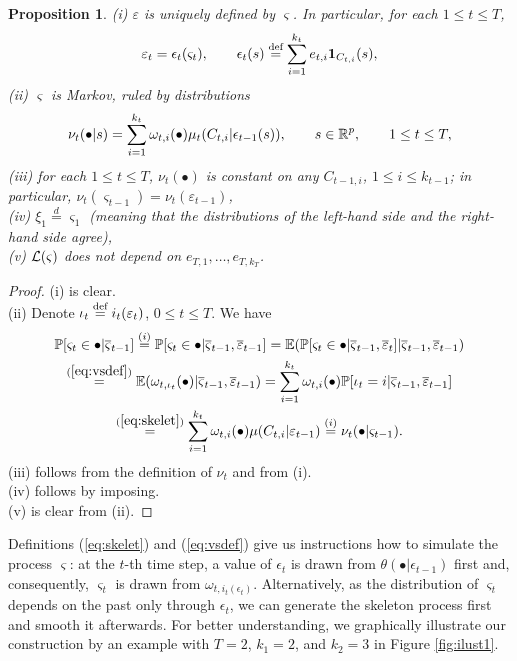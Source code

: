 \documentclass{article}              %
\newtheorem{proposition}{Proposition}
\begin{document}
\begin{proposition}
\label{prop:vs}(i) $\varepsilon$ is uniquely defined by $\varsigma$.
In particular, for each $1\leq t\leq T$, 
\[
\varepsilon_{t}=\epsilon_{t}(\varsigma_{t}),\qquad\epsilon_{t}(s)\stackrel{\text{\rm def}}{=}\sum_{i=1}^{k_{t}}e_{t,i}\mathbf{1}_{C_{t,i}}(s),
\]
(ii) $\varsigma$ is Markov, ruled by distributions 
\[
\nu_{t}(\bullet|s)=\sum_{i=1}^{k_{t}}\omega_{t,i}(\bullet)\mu_{t}(C_{t,i}|\epsilon_{t-1}(s)),\qquad s\in\mathbb{R}^p,\qquad  1\leq t\leq T,
\]
(iii) for each $1\leq t\leq T$, $\nu_{t}(\bullet)$ is constant on any $C_{t-1,i}$, $1\leq i\leq k_{t-1}$; in particular, $\nu_{t}(\varsigma_{t-1})=\nu_{t}(\varepsilon_{t-1})$,\\
(iv) $\xi_{1}\stackrel{d}{=}\varsigma_{1}$ (meaning that the distributions of the left-hand side and the right-hand side agree),\\
(v) $\mathcal{L}(\varsigma)$ does not depend on $e_{T,1},\dots,e_{T,k_T}$.
\end{proposition}

\begin{proof}
(i) is clear.\\
(ii) Denote 
$\iota_{t}\stackrel{\text{\rm def}}{=} i_{t}(\varepsilon_{t})$, $0\leq t\leq T.$
We have
\begin{multline*}
\mathbb{P}[\varsigma_{t}\in\bullet|\overline{\varsigma}_{t-1}]\stackrel{(i)}{=}\mathbb{P}[\varsigma_{t}\in\bullet|\overline{\varsigma}_{t-1},\overline{\varepsilon}_{t-1}]=\mathbb{E}(\mathbb{P}[\varsigma_{t}\in\bullet|\overline{\varsigma}_{t-1},\overline{\varepsilon}_{t}]|\overline{\varsigma}_{t-1},\overline{\varepsilon}_{t-1})
\\
\stackrel{(\ref{eq:vsdef})}{=}\mathbb{E}(\omega_{t,\iota_{t}}(\bullet)|\overline{\varsigma}_{t-1},\overline{\varepsilon}_{t-1})
=\sum_{i=1}^{k_{t}}\omega_{t,i}(\bullet)\mathbb{P}[\iota_{t}=i|\overline{\varsigma}_{t-1},\overline{\varepsilon}_{t-1}]\\ \stackrel{(\ref{eq:skelet})}{=}
\sum_{i=1}^{k_{t}}\omega_{t,i}(\bullet)\mu(C_{t,i}|\varepsilon_{t-1})
\stackrel{(i)}{=}\nu_{t}(\bullet|\varsigma_{t-1}).
\end{multline*}
(iii) follows from the definition of $\nu_t$ and from (i).\\
(iv) follows by imposing. \\
(v) is clear from (ii). 
\end{proof}
\noindent Definitions (\ref{eq:skelet}) and (\ref{eq:vsdef}) give us instructions how to simulate the process $\varsigma$: at the $t$-th time step, a value of $\epsilon_t$  is drawn from $\theta(\bullet|\epsilon_{t-1})$ first and, consequently, $\varsigma_t$ is 
drawn from $\omega_{t,i_t(\epsilon_t)}$. Alternatively, as the distribution of $\varsigma_t$ depends on the past only through $\epsilon_t$, we can generate the skeleton process first and smooth it afterwards. For better understanding, we graphically illustrate our construction 
by an example with $T=2$, $k_1=2$, and $k_2=3$ in Figure \ref{fig:ilust1}. 
\end{document}
